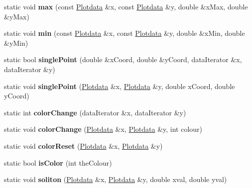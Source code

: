 \begin{DoxyCompactItemize}
\item 
static void {\bfseries max} (const \hyperlink{class_plotdata}{Plotdata} \&x, const \hyperlink{class_plotdata}{Plotdata} \&y, double \&x\+Max, double \&y\+Max)\hypertarget{class_plotdata_ab6b47d4ad0597a6d6e8896426872f0c8}{}\label{class_plotdata_ab6b47d4ad0597a6d6e8896426872f0c8}

\item 
static void {\bfseries min} (const \hyperlink{class_plotdata}{Plotdata} \&x, const \hyperlink{class_plotdata}{Plotdata} \&y, double \&x\+Min, double \&y\+Min)\hypertarget{class_plotdata_a69b27a409f85d3a495b6e30f7c68b807}{}\label{class_plotdata_a69b27a409f85d3a495b6e30f7c68b807}

\item 
static bool {\bfseries single\+Point} (double \&x\+Coord, double \&y\+Coord, data\+Iterator \&x, data\+Iterator \&y)\hypertarget{class_plotdata_a17eeb8c14ddf2d626153cd78839f6ae2}{}\label{class_plotdata_a17eeb8c14ddf2d626153cd78839f6ae2}

\item 
static void {\bfseries single\+Point} (\hyperlink{class_plotdata}{Plotdata} \&x, \hyperlink{class_plotdata}{Plotdata} \&y, double x\+Coord, double y\+Coord)\hypertarget{class_plotdata_af65981894cf9849f9f3e919666fe924b}{}\label{class_plotdata_af65981894cf9849f9f3e919666fe924b}

\item 
static int {\bfseries color\+Change} (data\+Iterator \&x, data\+Iterator \&y)\hypertarget{class_plotdata_a9c359e59b709b47c35972f0c7fdd6a15}{}\label{class_plotdata_a9c359e59b709b47c35972f0c7fdd6a15}

\item 
static void {\bfseries color\+Change} (\hyperlink{class_plotdata}{Plotdata} \&x, \hyperlink{class_plotdata}{Plotdata} \&y, int colour)\hypertarget{class_plotdata_a27c7b6a744afeb947382e0847b344a04}{}\label{class_plotdata_a27c7b6a744afeb947382e0847b344a04}

\item 
static void {\bfseries color\+Reset} (\hyperlink{class_plotdata}{Plotdata} \&x, \hyperlink{class_plotdata}{Plotdata} \&y)\hypertarget{class_plotdata_a71f61bb06c68addab883a1113fc2c00d}{}\label{class_plotdata_a71f61bb06c68addab883a1113fc2c00d}

\item 
static bool {\bfseries is\+Color} (int the\+Colour)\hypertarget{class_plotdata_a7eaee11272f82697f19b4436c1c5e6a3}{}\label{class_plotdata_a7eaee11272f82697f19b4436c1c5e6a3}

\item 
static void {\bfseries soliton} (\hyperlink{class_plotdata}{Plotdata} \&x, \hyperlink{class_plotdata}{Plotdata} \&y, double xval, double yval)\hypertarget{class_plotdata_a05598194e959e6af4cab7493225c7fc7}{}\label{class_plotdata_a05598194e959e6af4cab7493225c7fc7}

\end{DoxyCompactItemize}

